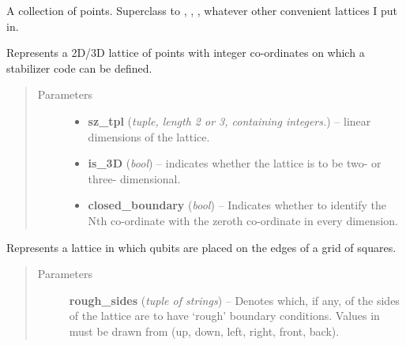 \documentclass[letterpaper,10pt,english]{sphinxmanual}
\begin{document}
\begin{fulllineitems}
\label{lattice:py_qcode.Lattice}
A collection of points. Superclass to , , , whatever other convenient lattices I put in.

Represents a 2D/3D lattice of points with integer 
co-ordinates on which a stabilizer code can be defined.
\begin{quote}\begin{description}
\item[{Parameters}] \leavevmode\begin{itemize}
\item {} 
\textbf{sz\_tpl} (\emph{tuple, length 2 or 3, containing integers.}) -- linear dimensions of the lattice.

\item {} 
\textbf{is\_3D} (\emph{bool}) -- indicates whether the lattice is to be two- or three- dimensional.

\item {} 
\textbf{closed\_boundary} (\emph{bool}) -- Indicates whether to identify the Nth co-ordinate with the zeroth co-ordinate in every dimension.

\end{itemize}

\end{description}\end{quote}

\end{fulllineitems}


\begin{fulllineitems}
\label{lattice:py_qcode.SquareLattice}
Represents a lattice in which qubits are placed on the edges of a grid of squares.
\begin{quote}\begin{description}
\item[{Parameters}] \leavevmode
\textbf{rough\_sides} (\emph{tuple of strings}) -- Denotes which, if any, of the sides of the lattice are to have `rough' boundary conditions. Values in  must be drawn from \code{{[}'u', 'd', 'r', 'l', 'f', 'b'{]}} (up, down, left, right, front, back).

\end{description}\end{quote}

\end{fulllineitems}
\end{document}

